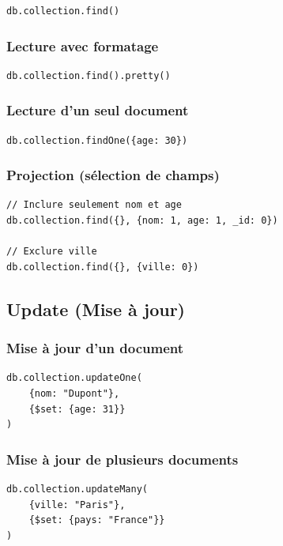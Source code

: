 \documentclass[11pt,a4paper]{article}
\begin{document}
\begin{lstlisting}
db.collection.find()
\end{lstlisting}

\subsubsection{Lecture avec formatage}

\begin{lstlisting}
db.collection.find().pretty()
\end{lstlisting}

\subsubsection{Lecture d'un seul document}

\begin{lstlisting}
db.collection.findOne({age: 30})
\end{lstlisting}

\subsubsection{Projection (sélection de champs)}

\begin{lstlisting}
// Inclure seulement nom et age
db.collection.find({}, {nom: 1, age: 1, _id: 0})

// Exclure ville
db.collection.find({}, {ville: 0})
\end{lstlisting}

\subsection{Update (Mise à jour)}

\subsubsection{Mise à jour d'un document}

\begin{lstlisting}
db.collection.updateOne(
    {nom: "Dupont"},
    {$set: {age: 31}}
)
\end{lstlisting}

\subsubsection{Mise à jour de plusieurs documents}

\begin{lstlisting}
db.collection.updateMany(
    {ville: "Paris"},
    {$set: {pays: "France"}}
)
\end{lstlisting}
\end{document}
